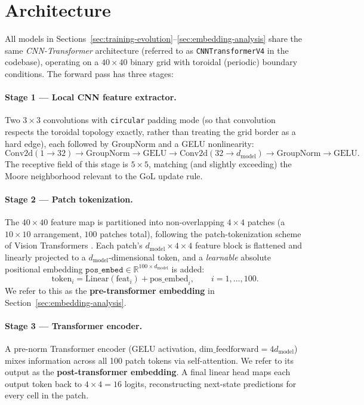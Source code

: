 \section{Architecture}
\label{sec:architecture}

All models in Sections~\ref{sec:training-evolution}--\ref{sec:embedding-analysis}
share the same \emph{CNN-Transformer} architecture (referred to as
\texttt{CNNTransformerV4} in the codebase), operating on a $40 \times 40$
binary grid with toroidal (periodic) boundary conditions. The forward pass
has three stages:

\paragraph{Stage 1 --- Local CNN feature extractor.}
Two $3\times 3$ convolutions with \texttt{circular} padding mode (so that
convolution respects the toroidal topology exactly, rather than treating
the grid border as a hard edge), each followed by GroupNorm and a GELU
nonlinearity:
\[
  \text{Conv2d}(1 \to 32) \to \text{GroupNorm} \to \text{GELU}
  \to \text{Conv2d}(32 \to d_{\text{model}}) \to \text{GroupNorm} \to \text{GELU}.
\]
The receptive field of this stage is $5\times 5$, matching (and slightly
exceeding) the Moore neighborhood relevant to the GoL update rule.

\paragraph{Stage 2 --- Patch tokenization.}
The $40\times 40$ feature map is partitioned into non-overlapping
$4\times 4$ patches (a $10\times 10$ arrangement, $100$ patches total),
following the patch-tokenization scheme of Vision Transformers
\cite{dosovitskiy2020vit}. Each
patch's $d_{\text{model}} \times 4 \times 4$ feature block is flattened and
linearly projected to a $d_{\text{model}}$-dimensional token, and a
\emph{learnable} absolute positional embedding
$\texttt{pos\_embed} \in \mathbb{R}^{100 \times d_{\text{model}}}$ is added:
\[
  \text{token}_i = \text{Linear}(\text{feat}_i) + \text{pos\_embed}_i,
  \qquad i = 1, \dots, 100.
\]
We refer to this as the \textbf{pre-transformer embedding} in
Section~\ref{sec:embedding-analysis}.

\paragraph{Stage 3 --- Transformer encoder.}
A pre-norm Transformer encoder \cite{vaswani2017attention} (GELU
activation, $\text{dim\_feedforward} = 4 d_{\text{model}}$) mixes
information across all 100 patch tokens via
self-attention. We refer to its output as the \textbf{post-transformer
embedding}. A final linear head maps each output token back to
$4\times 4 = 16$ logits, reconstructing next-state predictions for every
cell in the patch.

